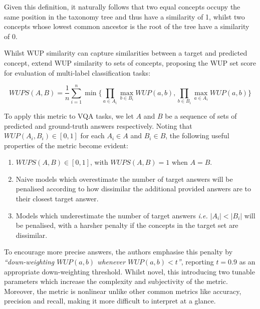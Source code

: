 Given this definition, it naturally follows that two equal concepts occupy the same position in the taxonomy tree and thus have a similarity of 1, whilst two concepts whose lowest common ancestor is the root of the tree have a similarity of 0.

Whilst WUP similarity can capture similarities between a target and predicted concept, \citeauthor{malinowski2014multiworld} extend WUP similarity to sets of concepts, proposing the WUP set score for evaluation of multi-label classification tasks:

\[WUPS(A, B) = \frac{1}{n} \sum_{i=1}^n \min \{\prod_{a \in A_i} \max_{b \in B_i} WUP(a, b), \prod_{b \in B_i} \max_{a \in A_i} WUP(a, b)\}\]

To apply this metric to VQA tasks, we let \(A\) and \(B\) be a sequence of sets of predicted and ground-truth answers respectively. Noting that \(WUP(A_i, B_i) \in [0, 1]\) for each \(A_i \in A\) and \(B_i \in B\), the following useful properties of the metric become evident:

\begin{enumerate}
    \item \(WUPS(A, B) \in [0, 1]\), with \(WUPS(A, B) = 1\) when \(A = B\).
    \item Naive models which overestimate the number of target answers will be penalised according to how dissimilar the additional provided answers are to their closest target answer.
    \item Models which underestimate the number of target answers \textit{i.e.} \(|A_i| < |B_i|\) will be penalised, with a harsher penalty if the concepts in the target set are dissimilar.
\end{enumerate}

To encourage more precise answers, the authors emphasise this penalty by \textit{``down-weighting \(WUP(a, b)\) whenever \(WUP(a, b) < t\)''}, reporting \(t = 0.9\) as an appropriate down-weighting threshold. Whilst novel, this introducing two tunable parameters which increase the complexity and subjectivity of the metric. Moreover, the metric is nonlinear unlike other common metrics like accuracy, precision and recall, making it more difficult to interpret at a glance.


